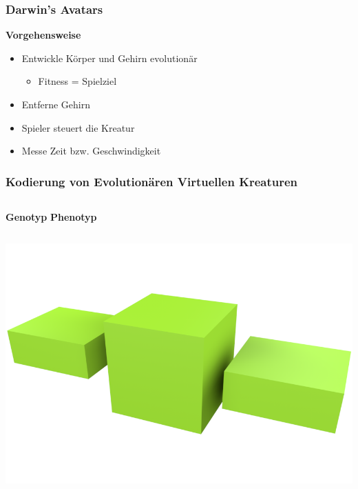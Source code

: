 \documentclass{beamer}
\begin{document}
\begin{frame}
	\frametitle{Darwin's Avatars}
	\textbf{Vorgehensweise}\\ \pause
	\begin{itemize}
		\item Entwickle Körper und Gehirn evolutionär \pause
		\begin{itemize}
			\item Fitness = Spielziel \pause
		\end{itemize} 
		\item Entferne Gehirn \pause
		\item Spieler steuert die Kreatur \pause
		\item Messe Zeit bzw. Geschwindigkeit
	\end{itemize}	
\end{frame}

\begin{frame}[t]
	\frametitle{Kodierung von Evolutionären Virtuellen Kreaturen}
	\begin{columns}[c]
		\centering
		\textbf{Genotyp}
		\centering
		\textbf{Phenotyp}
	\end{columns}
	\begin{columns}[c]
		\centering
		\pause
		\centering
		\includegraphics[width=\textwidth]{img/1.png}
		\column{0cm}
		\vspace{7.5cm}
	\end{columns}
\end{frame}
\end{document}
